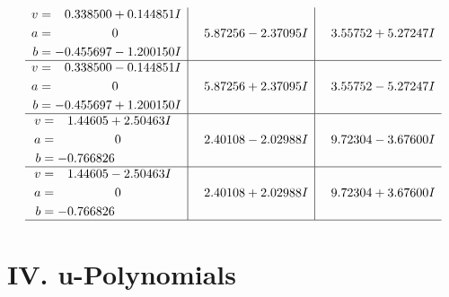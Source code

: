 \documentclass[1p]{elsarticle_modified}
\theoremstyle{definition}
\begin{document}
$$\begin{array}{c|c|c}
\begin{aligned}
v &= \phantom{-}0.338500 + 0.144851 I \\
a &= \phantom{-0.000000 } 0 \\
b &= -0.455697 - 1.200150 I\end{aligned}
 & \phantom{-}5.87256 - 2.37095 I & \phantom{-}3.55752 + 5.27247 I \\ \hline\begin{aligned}
v &= \phantom{-}0.338500 - 0.144851 I \\
a &= \phantom{-0.000000 } 0 \\
b &= -0.455697 + 1.200150 I\end{aligned}
 & \phantom{-}5.87256 + 2.37095 I & \phantom{-}3.55752 - 5.27247 I \\ \hline\begin{aligned}
v &= \phantom{-}1.44605 + 2.50463 I \\
a &= \phantom{-0.000000 } 0 \\
b &= -0.766826\phantom{ +0.000000I}\end{aligned}
 & \phantom{-}2.40108 - 2.02988 I & \phantom{-}9.72304 - 3.67600 I \\ \hline\begin{aligned}
v &= \phantom{-}1.44605 - 2.50463 I \\
a &= \phantom{-0.000000 } 0 \\
b &= -0.766826\phantom{ +0.000000I}\end{aligned}
 & \phantom{-}2.40108 + 2.02988 I & \phantom{-}9.72304 + 3.67600 I\\
 \hline 
 \end{array}$$\newpage
\newpage\renewcommand{\arraystretch}{1}
\centering \section*{ IV. u-Polynomials}
\end{document}
